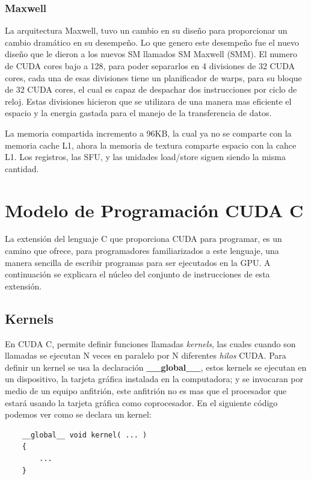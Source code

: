 \subsubsection{Maxwell}
La arquitectura Maxwell\cite{Maxwell}, tuvo un cambio en su diseño para proporcionar un cambio dramático en su desempeño. Lo que genero este desempeño fue el nuevo diseño que le dieron a los nuevos SM llamados SM Maxwell (SMM). El numero de CUDA cores bajo a 128, para poder separarlos en 4 divisiones de 32 CUDA cores, cada una de esas divisiones tiene un planificador de warps, para su bloque de 32 CUDA cores, el cual es capaz de despachar dos instrucciones por ciclo de reloj. Estas divisiones hicieron que se utilizara de una manera mas eficiente el espacio y la energia gastada para el manejo de la transferencia de datos.

La memoria compartida incremento a 96KB, la cual ya no se comparte con la memoria cache L1, ahora la memoria de textura comparte espacio con la cahce L1. Los registros, las SFU, y las unidades load/store siguen siendo la misma cantidad.



\section{Modelo de Programación CUDA C}
La extensión del lenguaje C que proporciona CUDA para programar, es un camino que ofrece, para programadores familiarizados a este lenguaje, una manera sencilla de escribir programas para ser ejecutados en la GPU. A continuación se explicara el núcleo del conjunto de instrucciones de esta extensión.
\subsection{Kernels}

En CUDA C, permite definir funciones llamadas \textit{kernels}, las cuales cuando son llamadas se ejecutan N veces en paralelo por N diferentes \textit{hilos} CUDA. Para definir un kernel se usa la declaración \textbf{\_\_global\_\_}, estos kernels se ejecutan en un dispositivo, la tarjeta gráfica instalada en la computadora; y se invocaran por medio de un equipo anfitrión, este anfitrión no es mas que el procesador que estará usando la tarjeta gráfica como coprocesador. En el siguiente código podemos ver como se declara un kernel: 

\begin{lstlisting}
	__global__ void kernel( ... )
    {
   		...
    }

\end{lstlisting}

